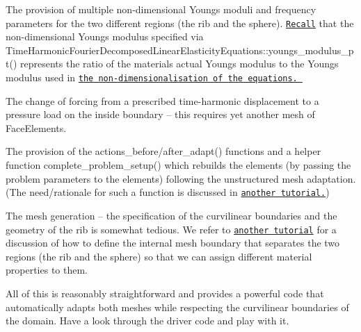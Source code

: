 \begin{DoxyItemize}
\item The provision of multiple non-\/dimensional Young\textquotesingle{}s moduli and frequency parameters for the two different regions (the rib and the sphere). \href{../../../time_harmonic_fourier_decomposed_linear_elasticity/cylinder/html/index.html#comments}{\tt Recall} that the non-\/dimensional Young\textquotesingle{}s modulus specified via {\ttfamily Time\+Harmonic\+Fourier\+Decomposed\+Linear\+Elasticity\+Equations\+::youngs\+\_\+modulus\+\_\+pt()} represents the ratio of the material\textquotesingle{}s actual Young\textquotesingle{}s modulus to the Young\textquotesingle{}s modulus used in \href{../../../time_harmonic_fourier_decomposed_linear_elasticity/cylinder/html/index.html#theory}{\tt the non-\/dimensionalisation of the equations. } ~\newline
~\newline

\item The change of forcing from a prescribed time-\/harmonic displacement to a pressure load on the inside boundary -- this requires yet another mesh of {\ttfamily Face\+Elements}. ~\newline
~\newline

\item The provision of the {\ttfamily actions\+\_\+before/after\+\_\+adapt}() functions and a helper function {\ttfamily complete\+\_\+problem\+\_\+setup()} which rebuilds the elements (by passing the problem parameters to the elements) following the unstructured mesh adaptation. (The need/rationale for such a function is discussed in \href{../../../meshes/mesh_from_inline_triangle/html/index.html}{\tt another tutorial.}) ~\newline
~\newline

\item The mesh generation -- the specification of the curvilinear boundaries and the geometry of the rib is somewhat tedious. We refer to \href{../../../meshes/mesh_from_inline_triangle_internal_boundaries/html/index.html}{\tt another tutorial} for a discussion of how to define the internal mesh boundary that separates the two regions (the rib and the sphere) so that we can assign different material properties to them. ~\newline
~\newline

\end{DoxyItemize}All of this is reasonably straightforward and provides a powerful code that automatically adapts both meshes while respecting the curvilinear boundaries of the domain. Have a look through the driver code and play with it.



